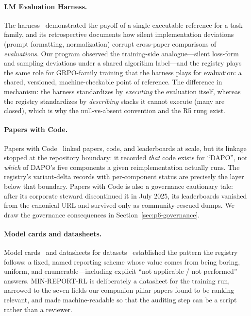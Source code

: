 \documentclass{article}
\begin{document}
\paragraph{LM Evaluation Harness.}
The harness~\citep{gao2021harness} demonstrated the payoff of a single
executable reference for a task family, and its retrospective
\citep{biderman2024lessons} documents how silent implementation deviations
(prompt formatting, normalization) corrupt cross-paper comparisons of
\emph{evaluations}. Our program observed the training-side analogue---silent
loss-form and sampling deviations under a shared algorithm label---and the
registry plays the same role for GRPO-family training that the harness plays
for evaluation: a shared, versioned, machine-checkable point of reference. The
difference in mechanism: the harness standardizes by \emph{executing} the
evaluation itself, whereas the registry standardizes by \emph{describing}
stacks it cannot execute (many are closed), which is why the null-vs-absent
convention and the R5 rung exist.

\paragraph{Papers with Code.}
Papers with Code~\citep{paperswithcode2025} linked papers, code, and
leaderboards at scale, but its linkage stopped at the repository boundary: it
recorded \emph{that} code exists for ``DAPO'', not \emph{which} of DAPO's five
components a given reimplementation actually runs. The registry's
variant-delta records with per-component status are precisely the layer below
that boundary. Papers with Code is also a governance cautionary tale: after
its corporate steward discontinued it in July 2025, its leaderboards vanished
from the canonical URL and survived only as community-rescued dumps. We draw
the governance consequences in Section~\ref{sec:p6-governance}.

\paragraph{Model cards and datasheets.}
Model cards~\citep{mitchell2019modelcards} and datasheets for
datasets~\citep{gebru2021datasheets} established the pattern the registry
follows: a fixed, named reporting scheme whose value comes from being boring,
uniform, and enumerable---including explicit ``not applicable / not
performed'' answers. MIN-REPORT-RL is deliberately a datasheet for the
training run, narrowed to the seven fields our companion pillar papers found
to be ranking-relevant, and made machine-readable so that the auditing step
can be a script rather than a reviewer.
\end{document}
